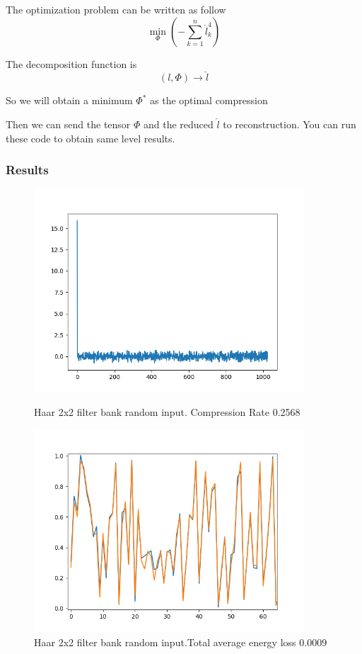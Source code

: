 \documentclass{article}
\theoremstyle{definition} %
\begin{document}
The optimization problem can be written as follow
\[
    \min_{\Phi}(-\sum_{k=1}^{n}\hat{l}_k^4)
\]

The decomposition function is
\[
    (l,\Phi)\to \hat{l}
\]

So we will obtain a minimum \(\Phi^*\) as the optimal
compression

Then we can send the tensor \(\Phi\) and the reduced
\(\mathring{l}\) to reconstruction.
You can run these \cite[Code]{HaarAugmentedBAT} code to obtain same level results.

\subsubsection{Results}
\begin{figure}[ht!]
    \centering
    \begin{minipage}{0.45\textwidth}
        \centering
        \includegraphics[width=0.9\textwidth]{fig/HaarAugmented1D_freq.png} %
        \caption{Haar 2x2 filter bank random input. Compression Rate 0.2568}
        \label{fig:Haar}
    \end{minipage}\hfill
    \begin{minipage}{0.45\textwidth}
        \centering
        \includegraphics[width=0.9\textwidth]{fig/HaarAugmented1D_rec.png} %
        \caption{Haar 2x2 filter bank random input.Total average energy loss 0.0009}
    \end{minipage}
\end{figure}
\end{document}
